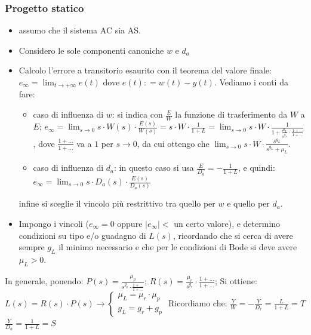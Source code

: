 \begin{landscape}
\begin{multicols*}{3}
    \subsubsection*{Progetto statico}
    \begin{itemize}
        \item assumo che il sistema AC sia AS.
        \item Considero le sole componenti canoniche $w$ e $d_a$
        \item Calcolo l'errore a transitorio esaurito con il teorema del valore finale:\newline
        $e_\infty = \lim_{t\rightarrow +\infty} e(t)$ dove $e(t) : = w(t) - y(t)$.\newline
        Vediamo i conti da fare:
        \begin{itemize}
            \item caso di influenza di $w$: si indica con $\frac{E}{W}$ la funzione di trasferimento da $W$ a $E$; $e_\infty = \lim_{s\rightarrow 0} s \cdot W(s) \cdot \frac{E(s)}{W(s)} = s \cdot W \cdot  \frac{1}{1+L} = \lim_{s\rightarrow 0} s \cdot W \cdot \frac{1}{1+ \frac{\mu_L}{s^{g_L}} \cdot \frac{1 + \dots}{1 + \dots}}$, dove $\frac{1 + \dots}{1 + \dots}$ va a $1$ per $s \rightarrow 0$, da cui ottengo che $\lim_{s\rightarrow 0} s \cdot W \cdot \frac{s^{g_L}}{s^{g_L} + \mu_L}$.
            \item caso di influenza di $d_a$: in questo caso si usa $\frac{E}{D_a} = - \frac{1}{1+L}$, e quindi: $e_\infty = \lim_{s\rightarrow 0} s \cdot D_a(s) \cdot \frac{E(s)}{D_a(s)}$
        \end{itemize}
        infine si sceglie il vincolo più restrittivo tra quello per $w$ e quello per $d_a$.
        \item Impongo i vincoli ($e_\infty = 0$ oppure $|e_\infty| < $ un certo valore), e determino condizioni su tipo e/o guadagno di $L(s)$, ricordando che si cerca di avere sempre $g_L$ il minimo necessario e che per le condizioni di Bode si deve avere $\mu_L > 0$.
    \end{itemize}
    In generale, ponendo: \newline
    $P(s) = \frac{\mu_p}{s^{g_p} \cdot  \frac{1+ \dots}{1+ \dots}}$;\newline
    $R(s) = \frac{\mu_r}{s^{g_r}} \cdot  \frac{1+ \dots}{1+ \dots}$;\newline
    Si ottiene: \newline
    $L(s) = R(s) \cdot P(s) \rightarrow \begin{cases}
        \mu_L = \mu_r \cdot \mu_p\\
        g_L = g_r + g_p
    \end{cases}$\newline
    Ricordiamo che:\newline
    $\frac{Y}{W} = - \frac{Y}{D_r} = \frac{L}{1+L} = T$\newline
    $\frac{Y}{D_a} = \frac{1}{1+L} = S$

\end{multicols*}
\end{landscape}
